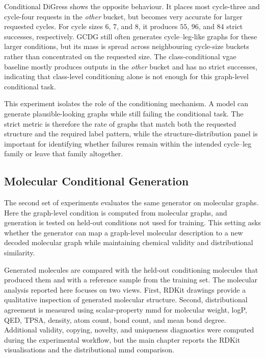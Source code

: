 Conditional DiGress shows the opposite behaviour. It places most cycle-three
and cycle-four requests in the \emph{other} bucket, but becomes very accurate
for larger requested cycles. For cycle sizes \(6\), \(7\), and \(8\), it
produces \(55\), \(96\), and \(84\) strict successes, respectively. GCDG still
often generates cycle--leg-like graphs for these larger conditions, but its
mass is spread across neighbouring cycle-size buckets rather than concentrated
on the requested size. The class-conditional \gls{vgae} baseline mostly
produces outputs in the \emph{other} bucket and has no strict successes,
indicating that class-level conditioning alone is not enough for this
graph-level conditional task.

This experiment isolates the role of the conditioning mechanism. A model can
generate plausible-looking graphs while still failing the conditional task. The
strict metric is therefore the rate of graphs that match both the requested
structure and the required label pattern, while the structure-distribution
panel is important for identifying whether failures remain within the intended
cycle--leg family or leave that family altogether.

\subsection{Molecular Conditional Generation}

The second set of experiments evaluates the same generator on molecular graphs.
Here the graph-level condition is computed from molecular graphs, and generation
is tested on held-out conditions not used for training. This setting asks
whether the generator can map a graph-level molecular description to a new
decoded molecular graph while maintaining chemical validity and distributional
similarity.

Generated molecules are compared with the held-out conditioning molecules that
produced them and with a reference sample from the training set. The molecular
analysis reported here focuses on two views. First, RDKit drawings provide a
qualitative inspection of generated molecular structure. Second,
distributional agreement is measured using scalar-property \gls{mmd} for
molecular weight, logP, QED, TPSA, density, atom count, bond count, and mean
bond degree. Additional validity, copying, novelty, and uniqueness diagnostics
were computed during the experimental workflow, but the main chapter reports
the RDKit visualisations and the distributional \gls{mmd} comparison.

